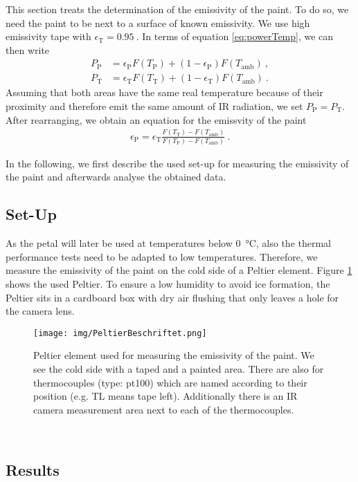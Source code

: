 This section treats the determination of the emissivity of the paint. To do so, we need the paint to be next to a surface of known emissivity. We use high emissivity tape with $\epsilon_\text{T} = \SI{0.95}{}$. In terms of equation \eqref{eq:powerTemp}, we can then write
\begin{align*}
	P_\text{P} &= \epsilon_\text{P}F(T_\text{P}) + (1-\epsilon_\text{P})F(T_\text{amb}) \ , \\
	P_\text{T} &= \epsilon_\text{T}F(T_\text{T}) + (1-\epsilon_\text{T})F(T_\text{amb}) \ .
\end{align*}
Assuming that both areas have the same real temperature because of their proximity and therefore emit the same amount of IR radiation, we set $P_\text{P}=P_\text{T}$. After rearranging, we obtain an equation for the emissvity of the paint
\begin{align}
	\epsilon_\text{P} = \epsilon_\text{T}\frac{F(T_\text{T})-F(T_\text{amb})}{F(T_\text{P})-F(T_\text{amb})} \ .
\end{align}



In the following, we first describe the used set-up for measuring the emissivity of the paint and afterwards analyse the obtained data.
\subsection{Set-Up}
As the petal will later be used at temperatures below \SI{0}{\degreeCelsius}, also the thermal performance tests need to be adapted to low temperatures. Therefore, we measure the emissivity of the paint on the cold side of a Peltier element. Figure \ref{fig:peltier} shows the used Peltier.
To ensure a low humidity to avoid ice formation, the Peltier sits in a cardboard box with dry air flushing that only leaves a hole for the camera lens.
\begin{figure}[h!]
	\centering
	\texttt{[image: img/PeltierBeschriftet.png]}
	\caption{Peltier element used for measuring the emissivity of the paint. We see the cold side with a taped and a painted area. There are also for thermocouples (type: pt100) which are named according to their position (e.g. TL means tape left). Additionally there is an IR camera measurement area next to each of the thermocouples.}
	\label{fig:peltier}
\end{figure} \\


\subsection{Results}


\clearpage